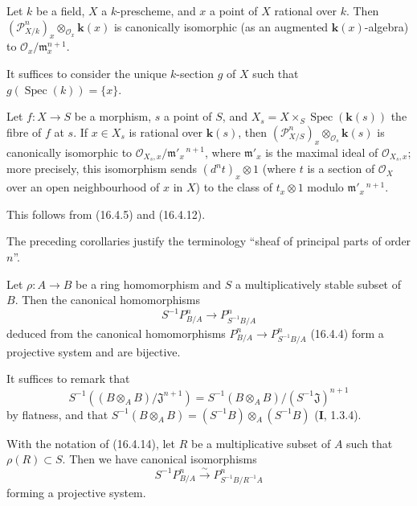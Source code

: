 \begin{corollary}[16.4.12]
\label{IV.16.4.12}
Let $k$ be a field, $X$ a $k$-prescheme, and $x$ a point of $X$ \textup{rational over}
$k$. Then $(\mathscr{P}_{X/k}^n)_x\otimes_{\mathcal{O}_x}\boldsymbol{k}(x)$ is
canonically isomorphic (as an augmented $\boldsymbol{k}(x)$-algebra) to
$\mathcal{O}_x/\mathfrak{m}_x^{n+1}$.
\end{corollary}

It suffices to consider the unique $k$-section $g$ of $X$ such that
$g(\operatorname{Spec}(k))=\{x\}$.

\begin{corollary}[16.4.13]
\label{IV.16.4.13}
Let $f:X\to S$ be a morphism, $s$ a point of $S$, and
$X_s=X\times_S\operatorname{Spec}(\boldsymbol{k}(s))$ the fibre of $f$ at $s$. If
$x\in X_s$ is \textup{rational over} $\boldsymbol{k}(s)$, then
$(\mathscr{P}_{X/S}^n)_x\otimes_{\mathcal{O}_s}\boldsymbol{k}(s)$ is canonically
isomorphic to $\mathcal{O}_{X_s,x}/\mathfrak{m}'_x{}^{\,n+1}$, where
$\mathfrak{m}'_x$ is the maximal ideal of $\mathcal{O}_{X_s,x}$; more
precisely, this isomorphism sends $(d^n t)_x\otimes1$ \textup{(where $t$ is a
section of $\mathcal{O}_X$ over an open neighbourhood of $x$ in
$X$)} to the class of $t_x\otimes1$ modulo $\mathfrak{m}'_x{}^{\,n+1}$.
\end{corollary}

This follows from (16.4.5) and (16.4.12).

The preceding corollaries justify the terminology ``sheaf of principal parts
of order $n$''.

\begin{proposition}[16.4.14]
\label{IV.16.4.14}
Let $\rho:A\to B$ be a ring homomorphism and $S$ a multiplicatively stable
subset of $B$. Then the canonical homomorphisms
\[
  S^{-1}P_{B/A}^n\longrightarrow P_{S^{-1}B/A}^n
  \tag{16.4.14.1}
  \label{IV.16.4.14.1}
\]
deduced from the canonical homomorphisms
$P_{B/A}^n\to P_{S^{-1}B/A}^n$ (16.4.4) form a projective system and are
bijective.
\end{proposition}

It suffices to remark that
\[
  S^{-1}((B\otimes_A B)/\mathfrak{J}^{n+1})
  =S^{-1}(B\otimes_A B)/(S^{-1}\mathfrak{J})^{n+1}
\]
by flatness, and that
$S^{-1}(B\otimes_A B)=(S^{-1}B)\otimes_A(S^{-1}B)$ (\textbf{I}, 1.3.4).

\begin{corollary}[16.4.15]
\label{IV.16.4.15}
With the notation of (16.4.14), let $R$ be a multiplicative subset of
$A$ such that $\rho(R)\subset S$. Then we have canonical isomorphisms
\[
  S^{-1}P_{B/A}^n\xrightarrow{\sim}P_{S^{-1}B/R^{-1}A}^n
  \tag{16.4.15.1}
  \label{IV.16.4.15.1}
\]
forming a projective system.
\end{corollary}

